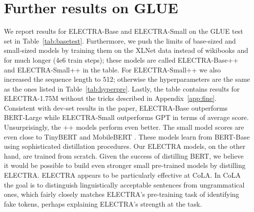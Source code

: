 \documentclass{article}
\begin{document}
\section{Further results on GLUE}
\label{app:test}
We report results for ELECTRA-Base and ELECTRA-Small on the GLUE test set in Table~\ref{tab:basetest}. 
Furthermore, we push the limits of base-sized and small-sized models by training them on the XLNet data instead of wikibooks and for much longer (4e6 train steps); these models are called ELECTRA-Base++ and ELECTRA-Small++ in the table. 
For ELECTRA-Small++ we also increased the sequence length to 512; otherwise the hyperparameters are the same as the ones listed in Table~\ref{tab:hyperpre}.
Lastly, the table contains results for ELECTRA-1.75M without the tricks described in Appendix~\ref{app:fine}.
Consistent with dev-set results in the paper, ELECTRA-Base outperforms BERT-Large while ELECTRA-Small outperforms GPT in terms of average score.
Unsurprisingly, the ++ models perform even better.
The small model scores are even close to TinyBERT \citep{jiao2019tinybert} and MobileBERT \citep{sunmobilebert}. These models learn from BERT-Base using sophisticated distillation procedures. 
Our ELECTRA models, on the other hand, are trained from scratch. 
Given the success of distilling BERT, we believe it would be possible to build even stronger small pre-trained models by distilling ELECTRA. 
ELECTRA appears to be particularly effective at CoLA.
In CoLA the goal is to distinguish linguistically acceptable sentences from ungrammatical ones, which fairly closely matches ELECTRA's pre-training task of identifying fake tokens, perhaps explaining ELECTRA's strength at the task.
\end{document}
